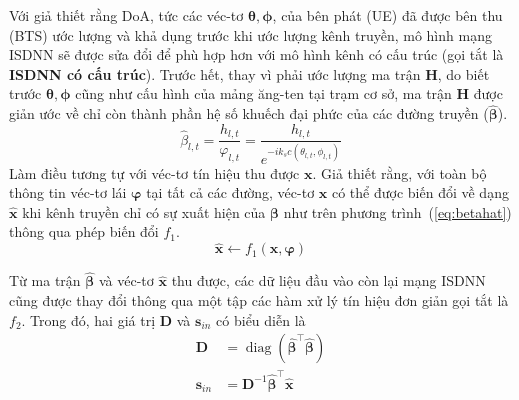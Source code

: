 Với giả thiết rằng DoA, tức các véc-tơ $\boldsymbol\theta, \boldsymbol\phi$, của bên phát (UE) đã được bên thu (BTS) ước lượng và khả dụng trước khi ước lượng kênh truyền, mô hình mạng ISDNN sẽ được sửa đổi để phù hợp hơn với mô hình kênh có cấu trúc (gọi tắt là \textbf{ISDNN có cấu trúc}). Trước hết, thay vì phải ước lượng ma trận $\mathbf{H}$, do biết trước $\boldsymbol\theta, \boldsymbol\phi$ cũng như cấu hình của mảng ăng-ten tại trạm cơ sở, ma trận $\mathbf{H}$ được giản ước về chỉ còn thành phần hệ số khuếch đại phức của các đường truyền ($\hat{\boldsymbol{\beta}}$).
\begin{equation}
\label{eq:betahat}
    \hat{\beta}_{l, t} = \frac{h_{l, t}} {\varphi_{l,t}}= \frac{h_{l, t}}{e^{-i k_s c (\theta_{l,t}, \phi_{l, t})}}
\end{equation}
Làm điều tương tự với véc-tơ tín hiệu thu được $\mathbf{x}$. Giả thiết rằng, với toàn bộ thông tin véc-tơ lái $\boldsymbol{\varphi}$ tại tất cả các đường, véc-tơ $\mathbf{x}$ có thể được biến đổi về dạng $\hat{\mathbf{x}}$ khi kênh truyền chỉ có sự xuất hiện của $\boldsymbol{\beta}$ như trên phương trình~(\ref{eq:betahat}) thông qua phép biến đổi $f_1$.
\begin{equation}
    \hat{\mathbf{x}} \longleftarrow f_1(\mathbf{x}, \boldsymbol{\varphi})
\end{equation}

Từ ma trận $\hat{\boldsymbol{\beta}}$ và véc-tơ $\hat{\mathbf{x}}$ thu được, các dữ liệu đầu vào còn lại mạng ISDNN cũng được thay đổi thông qua một tập các hàm xử lý tín hiệu đơn giản gọi tắt là $f_2$. Trong đó, hai giá trị $\mathbf{D}$ và $\mathbf{s}_{in}$ có biểu diễn là
\begin{equation}
    \begin{aligned}
        \mathbf{D} &= \operatorname{diag}(\hat{\boldsymbol{\beta}}^\top \hat{\boldsymbol{\beta}}) \\
        \mathbf{s}_{in} &= \mathbf{D}^{-1} \hat{\boldsymbol{\beta}}^\top \hat{\mathbf{x}}
    \end{aligned}
\end{equation}

